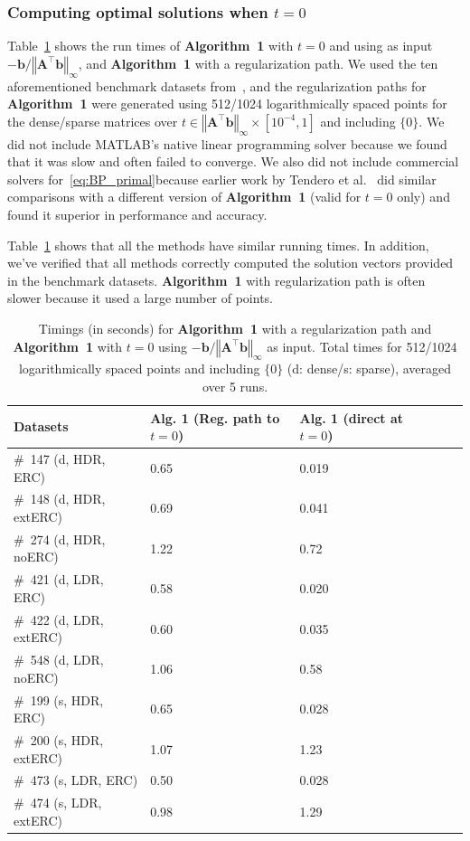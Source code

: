 \documentclass[11pt]{article}
\numberwithin{prop}{section}
\numberwithin{lem}{section}
\numberwithin{rem}{section}
\numberwithin{cor}{section}
\numberwithin{thm}{section}
\numberwithin{defn}{section}
\numberwithin{fact}{section}
\theoremstyle{plain}
\def\bb {\boldsymbol{b}}
\newcommand{\norminf}[1]{\left\Vert{#1} \right\Vert_{\infty}}
\newcommand{\matr}[1]{\bm{#1}}
\def\Atop {\matr{A}^{\top}}
\begin{document}
\subsubsection{Computing optimal solutions when $t = 0$}
Table~\ref{tab:timings2} shows the run times of \textbf{Algorithm~1} with $t=0$ and using as input $-\bb/\norminf{\Atop\bb}$, and \textbf{Algorithm~1} with a regularization path. We used the ten aforementioned benchmark datasets from~\cite{lorenz2015solving}, and the regularization paths for \textbf{Algorithm~1} were generated using 512/1024 logarithmically spaced points for the dense/sparse matrices over $t \in \norminf{\Atop\bb} \times [10^{-4},1]$ and including $\{0\}$. We did not include MATLAB's native linear programming solver because we found that it was slow and often failed to converge. We also did not include commercial solvers for~\eqref{eq:BP_primal}because earlier work by Tendero et al.~\cite{tendero2021algorithm} did similar comparisons with a different version of \textbf{Algorithm~1} (valid for $t=0$ only) and found it superior in performance and accuracy.


Table~\ref{tab:timings2} shows that all the methods have similar running times. In addition, we've verified that all methods correctly computed the solution vectors provided in the benchmark datasets. \textbf{Algorithm~1} with regularization path is often slower because it used a large number of points.
\begin{table}[ht]
    \centering
    \begin{tabular}{|l|l|l|l|l|l}
    \hline
        Datasets  & \textbf{Alg. 1} (Reg. path to $t=0$) & \textbf{Alg. 1} (direct at $t=0$)\\
        \hline
        \#~147 (d, HDR, ERC)  & 0.65 & 0.019   \\
        \hline
        \#~148 (d, HDR, extERC)  & 0.69  & 0.041\\
        \hline
        \#~274 (d, HDR, noERC)  & 1.22  & 0.72 \\
        \hline
        \#~421 (d, LDR, ERC)  & 0.58 & 0.020  \\
        \hline
        \#~422 (d, LDR, extERC)  & 0.60 & 0.035  \\
        \hline
        \#~548 (d, LDR, noERC)  & 1.06 & 0.58  \\
        \hline
        \#~199 (s, HDR, ERC)  & 0.65 & 0.028 \\
        \hline
        \#~200 (s, HDR, extERC)  & 1.07 & 1.23 \\
        \hline
        \#~473 (s, LDR, ERC)  & 0.50 & 0.028  \\
        \hline
        \#~474 (s, LDR, extERC)  & 0.98 & 1.29 \\
        \hline
    \end{tabular}
    \caption{Timings (in seconds) for \textbf{Algorithm~1} with a regularization path and \textbf{Algorithm~1} with $t=0$ using $-\bb/\norminf{\Atop\bb}$ as input. Total times for 512/1024 logarithmically spaced points and including $\{0\}$ (d: dense/s: sparse), averaged over 5 runs. \label{tab:timings2}}
\end{table}
\end{document}
